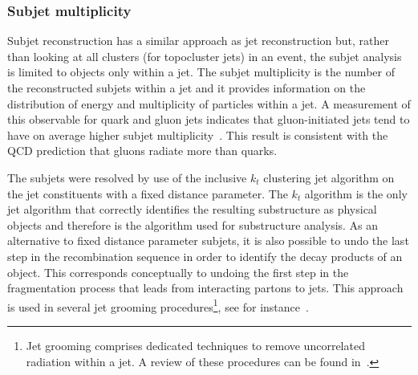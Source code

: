 \subsubsection{Subjet multiplicity} 


Subjet reconstruction has a similar approach as jet reconstruction but, rather than looking at all clusters (for topocluster jets) in an event, the subjet analysis is limited to objects only within a jet.  The subjet multiplicity is the number of the reconstructed subjets within a jet and it provides information on the distribution of energy and multiplicity of particles within a jet.  A measurement of this observable for quark and gluon jets indicates that gluon-initiated jets tend to have on average higher subjet multiplicity~\cite{Snihur1999494}. %
This result is consistent with the QCD prediction that gluons radiate more than quarks.  %

The subjets were resolved by use of the inclusive $k_t$ clustering jet algorithm on the jet constituents with a fixed distance parameter. The $k_t$ algorithm is the only jet algorithm that correctly identifies the resulting substructure as physical objects and therefore is the algorithm used for substructure analysis.
As an alternative to fixed distance parameter subjets, it is also possible to undo the last step in the recombination sequence in order to identify the decay products of an object. This corresponds conceptually to undoing the first step in the fragmentation process that leads from interacting partons to jets.  This approach is used in several jet grooming procedures\footnote{Jet grooming comprises dedicated techniques to remove uncorrelated radiation within a jet. A review of these procedures can be found in~\cite{Abdesselam:2010pt}. }, see for instance~\cite{pruning}.

